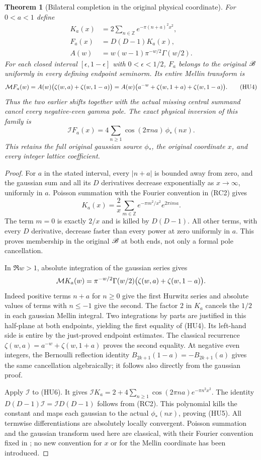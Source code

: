 \documentclass[11pt]{article}
\newtheorem{theorem}{Theorem}[section]
\begin{document}
\begin{theorem}[Bilateral completion in the original physical coordinate]
For $0<a<1$ define
\[
 \begin{split}
 K_a(x)&=2\sum_{n\in\mathbb Z}e^{-\pi(n+a)^2x^2},\\
 F_a(x)&=D(D-1)K_a(x),\\
 A(w)&=w(w-1)\pi^{-w/2}\Gamma(w/2).
 \end{split}
 \tag{HU3}
\]
For each closed interval $[\epsilon,1-\epsilon]$ with
$0<\epsilon<1/2$, $F_a$ belongs to the original $\mathscr B$ uniformly
in every defining endpoint seminorm. Its entire Mellin transform is
\[
 \mathcal M F_a(w)=A(w)\bigl(\zeta(w,a)+\zeta(w,1-a)\bigr)
 =A(w)\bigl(a^{-w}+\zeta(w,1+a)+\zeta(w,1-a)\bigr).
 \tag{HU4}
\]
Thus the two earlier shifts together with the actual missing
central summand cancel every negative-even gamma pole. The exact
physical inversion of this family is
\[
 \mathcal IF_a(x)=4\sum_{n\ge1}
                \cos(2\pi na)\,\phi_*(nx).
 \tag{HU5}
\]
This retains the full original gaussian source $\phi_*$, the
original coordinate $x$, and every integer lattice coefficient.
\end{theorem}
\begin{proof}
For $a$ in the stated interval, every $|n+a|$ is bounded away
from zero, and the gaussian sum and all its $D$ derivatives
decrease exponentially as $x\to\infty$, uniformly in $a$.
Poisson summation with the Fourier convention in (RC2) gives
\[
 K_a(x)=\frac2x\sum_{m\in\mathbb Z}
             e^{-\pi m^2/x^2}e^{2\pi ima}.
 \tag{HU6}
\]
The term $m=0$ is exactly $2/x$ and is killed by $D(D-1)$.
All other terms, with every $D$ derivative, decrease faster than
every power at zero uniformly in $a$. This proves membership in
the original $\mathscr B$ at both ends, not only a formal pole cancellation.

In $\Re w>1$, absolute integration of the gaussian series gives
\[
 \mathcal M K_a(w)=\pi^{-w/2}\Gamma(w/2)
                  \bigl(\zeta(w,a)+\zeta(w,1-a)\bigr).
\]
Indeed positive terms $n+a$ for $n\ge0$ give the first Hurwitz
series and absolute values of terms with $n\le-1$ give the second.
The factor $2$ in $K_a$ cancels the $1/2$ in each gaussian
Mellin integral. Two integrations by parts are justified in this
half-plane at both endpoints, yielding the first equality of
(HU4). Its left-hand side is entire by the just-proved endpoint
estimates. The classical recurrence
$\zeta(w,a)=a^{-w}+\zeta(w,1+a)$ proves the second equality.
At negative even integers, the Bernoulli reflection identity
$B_{2k+1}(1-a)=-B_{2k+1}(a)$ gives the same cancellation
algebraically; it follows also directly from the gaussian proof.

Apply $\mathcal I$ to (HU6). It gives
$\mathcal IK_a=2+4\sum_{n\ge1}\cos(2\pi na)e^{-\pi n^2x^2}$.
The identity $D(D-1)\mathcal I=\mathcal ID(D-1)$ follows
from (RC2). This polynomial kills the constant and maps each
gaussian to the actual $\phi_*(nx)$, proving (HU5).
All termwise differentiations are absolutely locally convergent.
Poisson summation and the gaussian transform used here are
classical, with their Fourier convention fixed in
\cite{cr:SteinFourier}; no new convention for $x$ or for the Mellin
coordinate has been introduced.
\end{proof}
\end{document}
